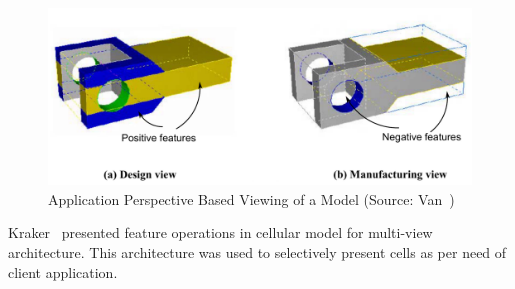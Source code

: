  
\begin{figure}[!h]
\centering     %
\includegraphics[width=0.85\linewidth,valign=t]{images/multiview.pdf}
\caption{Application Perspective Based Viewing of a Model (Source: Van~\cite{Van2000})}
\label{fig:litsurvey:multiview}
\end{figure}


Kraker~\cite{Kraker1998} presented feature operations in cellular model for multi-view architecture. This architecture was used to selectively present cells as per need of client application. 




